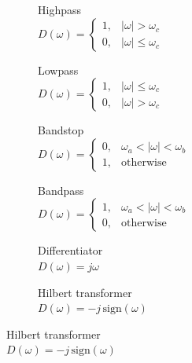 \begin{figure}[htp]

\begin{subfigure}{0.49\textwidth}
\centering
\newcommand{\coordinates}{coordinates {
(-3.14,1) (-1.569,1) (-1.571,0)
(1.571,0) (1.569,1) (3.14,1)
};}

\caption{Highpass\\[2mm]
$\displaystyle
D(\omega)=
\begin{cases}
1,&|\omega|>\omega_c\\
0,&|\omega|\le\omega_c
\end{cases}
$
}
\end{subfigure}
\begin{subfigure}{0.49\textwidth}
\centering
\newcommand{\coordinates}{coordinates {
(-3.14,0) (-1.569,0) (-1.571,1)
(1.571,1) (1.569,0) (3.14,0)
};}

\caption{Lowpass\\[2mm]
$\displaystyle
D(\omega)=
\begin{cases}
1,&|\omega|\le\omega_c\\
0,&|\omega|>\omega_c
\end{cases}
$
}
\end{subfigure}

\begin{subfigure}{0.49\textwidth}
\centering
\newcommand{\coordinates}{coordinates {
(-3.14,1) (-2.001,1) (-1.999,0)
(-1.001,0) (-0.999,1)
(0.999,1) (1.001,0)
(1.999,0) (2.001,1) (3.14,1)
};}

\caption{Bandstop\\[2mm]
$\displaystyle
D(\omega)=
\begin{cases}
0,&\omega_a<|\omega|<\omega_b\\
1,&\text{otherwise}
\end{cases}
$
}
\end{subfigure}
\begin{subfigure}{0.49\textwidth}
\centering
\newcommand{\coordinates}{coordinates {
(-3.14,0) (-2.001,0) (-1.999,1)
(-1.001,1) (-0.999,0)
(0.999,0) (1.001,1)
(1.999,1) (2.001,0) (3.14,0)
};}

\caption{Bandpass\\[2mm]
$\displaystyle
D(\omega)=
\begin{cases}
1,&\omega_a<|\omega|<\omega_b\\
0,&\text{otherwise}
\end{cases}
$
}
\end{subfigure}

\begin{subfigure}{0.49\textwidth}
\centering
\newcommand{\coordinates}{coordinates {
(-3.14,-1) (3.14,1)
};}

\caption{Differentiator\\[2mm]
$\displaystyle D(\omega)=j\omega$
}
\end{subfigure}
\begin{subfigure}{0.49\textwidth}
\centering
\newcommand{\coordinates}{coordinates {
(-3.14,1) (-0.001,1)
(0.001,-1) (3.14,-1)
};}

\caption{Hilbert transformer\\[2mm]
$\displaystyle D(\omega)=-j\,\mathrm{sign}(\omega)$
}
\end{subfigure}


\end{figure}

